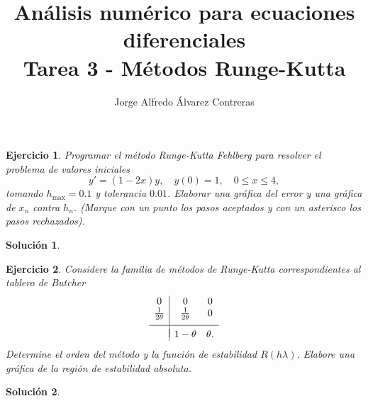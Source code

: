 \documentclass[11pt]{article}
\title{Análisis numérico para ecuaciones diferenciales \\
Tarea 3 - Métodos Runge-Kutta}
\author{Jorge Alfredo Álvarez Contreras}
\newtheorem{exercise}{Ejercicio}
\newtheorem*{sol}{Solución}
\begin{document}
\maketitle

\begin{exercise}
   Programar el método Runge-Kutta Fehlberg para resolver el problema
   de valores iniciales
   \begin{equation}
     y'
     =
     (1-2x)y,
     \quad y(0)=1,
     \quad 0\leq x\leq 4
   ,\end{equation}
   tomando $h_\mathrm{max}=0.1$ y tolerancia $0.01$. Elaborar una
   gráfica del error y una gráfica de $x_n$ contra $h_n$. (Marque con
   un punto los pasos aceptados y con un asterisco los pasos
   rechazados).
\end{exercise}
\begin{sol}
\end{sol}

\begin{exercise}
  Considere la familia de métodos de Runge-Kutta correspondientes al
  table\-ro de Butcher
  \begin{equation}
    \begin{array}{c|cc}
      0 & 0 & 0 \\
      \frac{1}{2\theta} & \frac{1}{2\theta} & 0 \\[2mm]
      \hline \\[-3mm]
                        & 1-\theta & \theta.
    \end{array}
  \end{equation}
  Determine el orden del método y la función de estabilidad
  $R(h\lambda)$. Elabore una gráfica de la región de estabilidad
  absoluta.
\end{exercise}
\begin{sol}
\end{sol}
\end{document}

